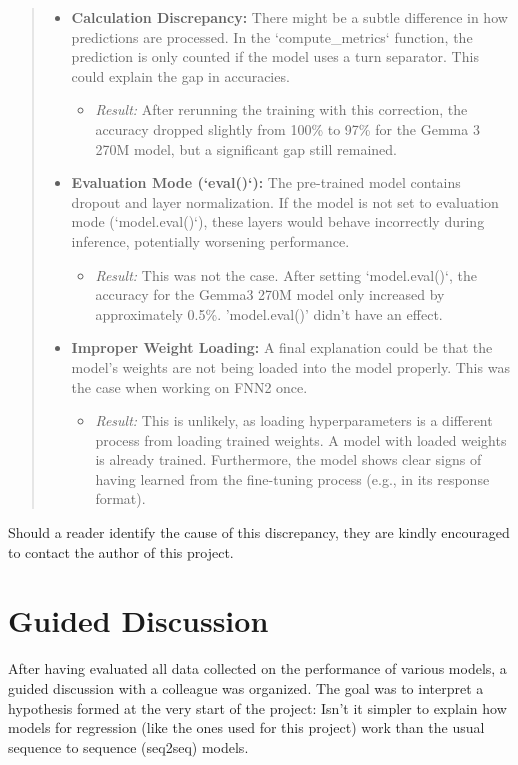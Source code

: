 \documentclass{article}
\begin{document}
\begin{quote}
{\begin{itemize}
    \item \textbf{Calculation Discrepancy:} There might be a subtle difference in how predictions are processed. In the `compute\_metrics` function, the prediction is only counted if the model uses a turn separator. This could explain the gap in accuracies.
        \begin{itemize}
            \item \textit{Result:} After rerunning the training with this correction, the accuracy dropped slightly from 100\% to 97\% for the Gemma 3 270M model, but a significant gap still remained.
        \end{itemize}

    \item \textbf{Evaluation Mode (`eval()`):} The pre-trained model contains dropout and layer normalization. If the model is not set to evaluation mode (`model.eval()`), these layers would behave incorrectly during inference, potentially worsening performance.
        \begin{itemize}
            \item \textit{Result:} This was not the case. After setting `model.eval()`, the accuracy for the Gemma3 270M model only increased by approximately 0.5\%. 'model.eval()' didn't have an effect.
        \end{itemize}

    \item \textbf{Improper Weight Loading:} A final explanation could be that the model's weights are not being loaded into the model properly. This was the case when working on FNN2 once.
        \begin{itemize}
            \item \textit{Result:} This is unlikely, as loading hyperparameters is a different process from loading trained weights. A model with loaded weights is already trained. Furthermore, the model shows clear signs of having learned from the fine-tuning process (e.g., in its response format).
        \end{itemize}
\end{itemize}
}
\end{quote}
Should a reader identify the cause of this discrepancy, they are kindly encouraged to contact the author of this project.

\section{Guided Discussion}
After having evaluated all data collected on the performance of various models, a guided discussion with a colleague was organized. The goal was to interpret a hypothesis formed at the very start of the project: Isn't it simpler to explain how models for regression (like the ones used for this project) work than the usual sequence to sequence (seq2seq) models.
\end{document}
